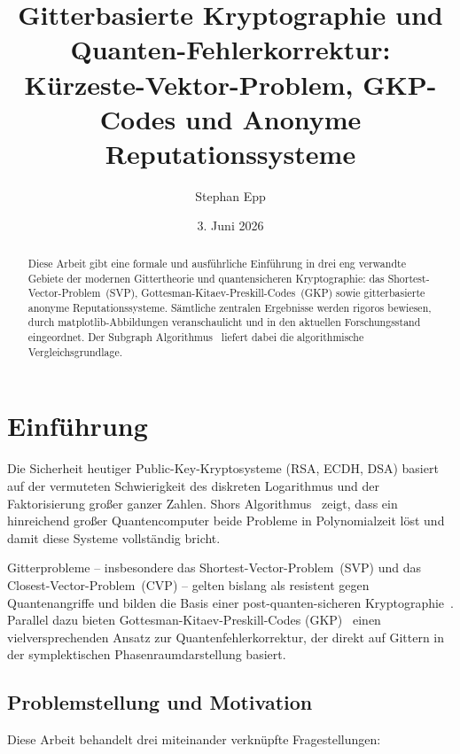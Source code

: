 ﻿\documentclass[a4paper,12pt]{article}
\title{\textbf{Gitterbasierte Kryptographie und Quanten-Fehlerkorrektur:}\\
\large Kürzeste-Vektor-Problem, GKP-Codes und Anonyme Reputationssysteme}
\author{Stephan Epp}
\date{3. Juni 2026}
\theoremstyle{definition}
\begin{document}
\maketitle

\begin{abstract}
Diese Arbeit gibt eine formale und ausführliche Einführung in drei eng verwandte Gebiete der
modernen Gittertheorie und quantensicheren Kryptographie: das Shortest-Vector-Problem~(SVP),
Gottesman-Kitaev-Preskill-Codes~(GKP) sowie gitterbasierte anonyme Reputationssysteme.
Sämtliche zentralen Ergebnisse werden rigoros bewiesen, durch matplotlib-Abbildungen
veranschaulicht und in den aktuellen Forschungsstand eingeordnet.
Der Subgraph Algorithmus~\cite{Epp2026Subgraph} liefert dabei die algorithmische Vergleichsgrundlage.
\end{abstract}

\tableofcontents
\newpage

\section{Einführung}

Die Sicherheit heutiger Public-Key-Kryptosysteme (RSA, ECDH, DSA) basiert auf
der vermuteten Schwierigkeit des diskreten Logarithmus und der Faktorisierung großer ganzer Zahlen.
Shors Algorithmus~\cite{Shor1994} zeigt, dass ein hinreichend großer Quantencomputer beide Probleme
in Polynomialzeit löst und damit diese Systeme vollständig bricht.

Gitterprobleme -- insbesondere das Shortest-Vector-Problem~(SVP) und das Closest-Vector-Problem~(CVP)
-- gelten bislang als resistent gegen Quantenangriffe und bilden die Basis einer post-quanten-sicheren
Kryptographie~\cite{Ajtai1996,Micciancio2009}.
Parallel dazu bieten Gottesman-Kitaev-Preskill-Codes (GKP)~\cite{GKP2001} einen
vielversprechenden Ansatz zur Quantenfehlerkorrektur, der direkt auf Gittern in der
symplektischen Phasenraumdarstellung basiert.

\subsection{Problemstellung und Motivation}

Diese Arbeit behandelt drei miteinander verknüpfte Fragestellungen:
\end{document}

